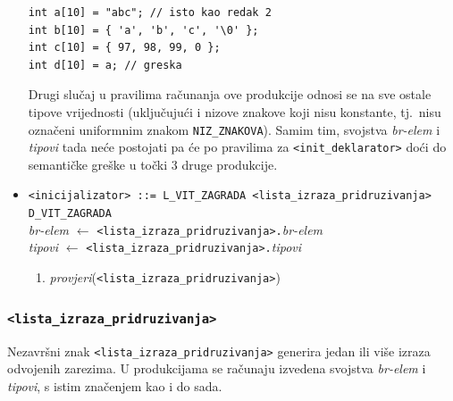 \documentclass[times, 12pt, utf8]{book}
\begin{document}
\begin{itemize}
\begin{lstlisting}[caption={Tri istovjetna načina inicijalizacije niza brojeva i greška.},label=lst:primjer_int_niz_inicijalizacija]
int a[10] = "abc"; // isto kao redak 2
int b[10] = { 'a', 'b', 'c', '\0' };
int c[10] = { 97, 98, 99, 0 };
int d[10] = a; // greska
\end{lstlisting}

Drugi slučaj u pravilima računanja ove produkcije odnosi se na sve ostale tipove vrijednosti (uključujući i nizove znakove koji nisu konstante, tj.~nisu označeni uniformnim znakom \verb|NIZ_ZNAKOVA|).
Samim tim, svojstva \emph{br-elem} i \emph{tipovi} tada neće postojati pa će po pravilima za \verb|<init_deklarator>| doći do semantičke greške u točki 3 druge produkcije.

\item
\verb|<inicijalizator> ::= L_VIT_ZAGRADA <lista_izraza_pridruzivanja> D_VIT_ZAGRADA|\\
\emph{br-elem} \(\leftarrow\) \verb|<lista_izraza_pridruzivanja>.|\emph{br-elem}\\
\emph{tipovi} \(\leftarrow\) \verb|<lista_izraza_pridruzivanja>.|\emph{tipovi}
\begin{enumerate}
\item
\emph{provjeri}(\verb|<lista_izraza_pridruzivanja>|)
\end{enumerate}

\end{itemize}


\subsubsection{\texttt{<lista\_izraza\_pridruzivanja>}}

Nezavršni znak \verb|<lista_izraza_pridruzivanja>| generira jedan ili više izraza odvojenih zarezima.
U produkcijama se računaju izvedena svojstva \emph{br-elem} i \emph{tipovi}, s istim značenjem kao i do sada.
\end{document}
